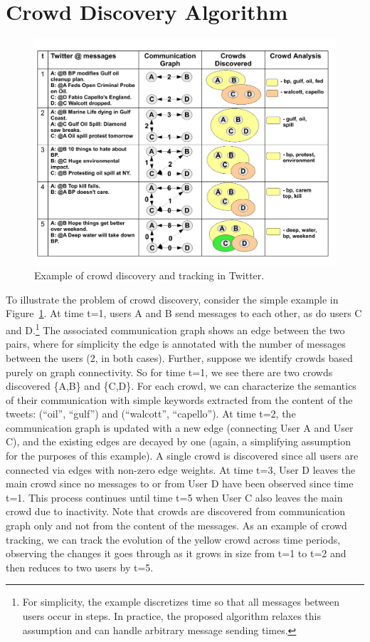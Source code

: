 \documentclass{sig-alternate}
\begin{document}
\section{Crowd Discovery Algorithm}
\label{sec:crowd_algorithm}
\begin{figure}
\centering
\includegraphics[width=\linewidth]{images/intro}
\caption{Example of crowd discovery and tracking in Twitter.}
\label{fig:intro-example}
\end{figure}
To illustrate the problem of crowd discovery, consider the simple example in
Figure~\ref{fig:intro-example}. At time t=1, users A and B send messages to each
other, as do users C and D.\footnote{For simplicity, the example discretizes
time so that all messages between users occur in steps. In practice, the proposed
algorithm relaxes this assumption and can handle arbitrary message sending
times.} The associated communication graph shows an edge between the two pairs,
where for simplicity the edge is annotated with the number of messages between
the users (2, in both cases). Further, suppose we identify crowds based purely on
graph connectivity. So for time t=1, we see there are two crowds discovered
\{A,B\} and \{C,D\}. For each crowd, we can characterize the semantics of their
communication with simple keywords extracted from the content of the tweets:
(``oil'', ``gulf'') and (``walcott'', ``capello''). At time t=2, the
communication graph is updated with a new edge (connecting User A and User C),
and the existing edges are decayed by one (again, a simplifying assumption for
the purposes of this example). A single crowd is discovered since all users are
connected via edges with non-zero edge weights. At time t=3, User D leaves the
main crowd since no messages to or from User D have been observed since time t=1.
This process continues until time t=5 when User C also leaves the main crowd due
to inactivity. Note that crowds are discovered from communication graph only and
not from the content of the messages. As an example of crowd tracking, we can
track the evolution of the yellow crowd across time periods, observing the
changes it goes through as it grows in size from t=1 to t=2 and then reduces to
two users by t=5.
\end{document}
